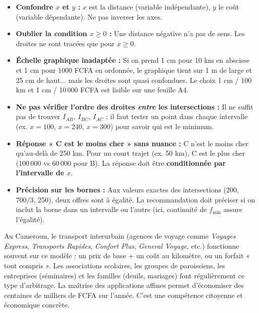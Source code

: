 \documentclass[11pt]{article}
\begin{document}
\begin{attention}
\begin{itemize}
    \item \textbf{Confondre $x$ et $y$ :} $x$ est la distance (variable indépendante), $y$ le coût (variable dépendante). Ne pas inverser les axes.
    \item \textbf{Oublier la condition $x \ge 0$ :} Une distance négative n'a pas de sens. Les droites ne sont tracées que pour $x \ge 0$.
    \item \textbf{Échelle graphique inadaptée :} Si on prend 1 cm pour 10 km en abscisse et 1 cm pour 1000 FCFA en ordonnée, le graphique tient sur 1 m de large et 25 cm de haut... mais les droites sont quasi confondues. Le choix 1 cm / 100 km et 1 cm / 10\,000 FCFA est lisible sur une feuille A4.
    \item \textbf{Ne pas vérifier l'ordre des droites \emph{entre} les intersections :} Il ne suffit pas de trouver $I_{AB}$, $I_{BC}$, $I_{AC}$ ; il faut tester un point dans chaque intervalle (ex. $x=100$, $x=240$, $x=300$) pour savoir qui est le minimum.
    \item \textbf{Réponse « C est le moins cher » sans nuance :} C n'est le moins cher qu'au-delà de 250 km. Pour un court trajet (ex. 50 km), C est le plus cher (100\,000 vs 60\,000 pour B). La réponse doit être \textbf{conditionnée par l'intervalle de $x$}.
    \item \textbf{Précision sur les bornes :} Aux valeurs exactes des intersections (200, $700/3$, 250), deux offres sont à égalité. La recommandation doit préciser si on inclut la borne dans un intervalle ou l'autre (ici, continuité de $f_{\min}$ assure l'égalité).
\end{itemize}
\end{attention}

\begin{savaistu}
Au Cameroun, le transport interurbain (agences de voyage comme \emph{Voyages Express}, \emph{Transports Rapides}, \emph{Confort Plus}, \emph{General Voyage}, etc.) fonctionne souvent sur ce modèle : un prix de base + un coût au kilomètre, ou un forfait « tout compris ». Les associations scolaires, les groupes de paroissiens, les entreprises (séminaires) et les familles (deuils, mariages) font régulièrement ce type d'arbitrage. La maîtrise des applications affines permet d'économiser des centaines de milliers de FCFA sur l'année. C'est une compétence citoyenne et économique concrète.
\end{savaistu}
\end{document}
